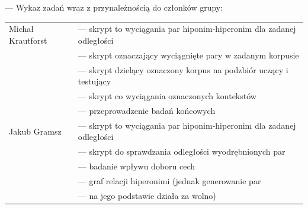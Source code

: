 \documentclass[a4paper,10pt]{report}
\begin{document}
\pagebreak
\centering---
\vfill{}
Wykaz zadań wraz z przynależnością do członków grupy:
\begin{center}
\begin{tabular}{ll}
\toprule
Michał Krautforst & --- skrypt to wyciągania par hiponim-hiperonim dla zadanej odległości \\
                  & --- skrypt oznaczający wyciągnięte pary w zadanym korpusie \\
                  & --- skrypt dzielący oznaczony korpus na podzbiór uczący i testujący \\
                  & --- skrypt co wyciągania oznaczonych kontekstów \\
                  & --- przeprowadzenie badań końcowych \\
\midrule
Jakub Gramsz      & --- skrypt to wyciągania par hiponim-hiperonim dla zadanej odległości\\
                  & --- skrypt do sprawdzania odległości wyodrębnionych par \\
                  & --- badanie wpływu doboru cech  \\
                  & --- graf relacji hiperonimi (jednak generowanie par \\
                  & --- na jego podstawie działa za wolno) \\
\bottomrule
\end{tabular}
\end{center}


\nocite{*}

\end{document}
